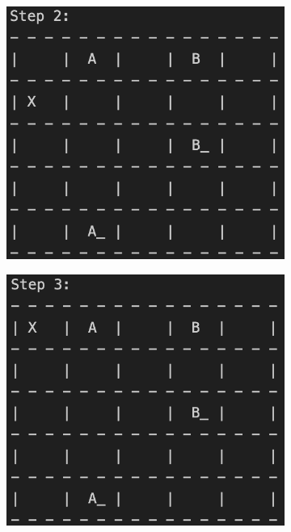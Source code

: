 \documentclass[11pt]{article}
\begin{document}
\begin{figure}[h]
    \vspace{1em} %
    
    \begin{subfigure}[b]{0.45\textwidth}
        \centering
        \includegraphics[width=\textwidth]{img/step_2.png}
    \end{subfigure}
    \hfill %
    \begin{subfigure}[b]{0.45\textwidth}
        \centering
        \includegraphics[width=\textwidth]{img/step_3.png}
    \end{subfigure}
\end{figure}
\end{document}
